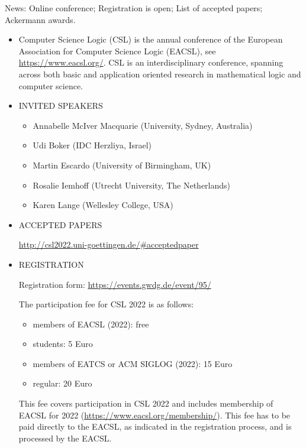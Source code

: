 \documentclass[prodmode,acmtecs]{acmsmall} %
\begin{document}
  News: Online conference; Registration is open; List of accepted papers; Ackermann awards. \\ 
\begin{itemize}\item  Computer Science Logic (CSL) is the annual conference of the European Association for Computer Science Logic (EACSL), see \href{https://www.eacsl.org/}{https://www.eacsl.org/}.  CSL is an interdisciplinary conference, spanning across both basic and application oriented research in mathematical logic and computer science.   
 
\item  INVITED SPEAKERS 
 
\begin{itemize}\item  Annabelle McIver Macquarie (University, Sydney, Australia)
\item  Udi Boker (IDC Herzliya, Israel)
\item  Martin Escardo (University of Birmingham, UK)
\item  Rosalie Iemhoff (Utrecht University, The Netherlands)
\item  Karen Lange (Wellesley College, USA)
\end{itemize} 
\item  ACCEPTED PAPERS 
 
  \href{http://csl2022.uni-goettingen.de/#acceptedpaper}{http://csl2022.uni-goettingen.de/\#acceptedpaper} 
 
\item  REGISTRATION 
 
  Registration form: \href{https://events.gwdg.de/event/95/}{https://events.gwdg.de/event/95/} 
 
  The participation fee for CSL 2022 is as follows: 
 
\begin{itemize}\item  members of EACSL (2022): free
\item  students: 5 Euro
\item  members of EATCS or ACM SIGLOG (2022): 15 Euro
\item  regular: 20 Euro  
\end{itemize} 
  This fee covers participation in CSL 2022 and includes membership of EACSL for 2022 (\href{https://www.eacsl.org/membership/}{https://www.eacsl.org/membership/}). This fee has to be paid directly to the EACSL, as indicated in the registration process, and is processed by the EACSL. 
 

\end{itemize}
\end{document}
